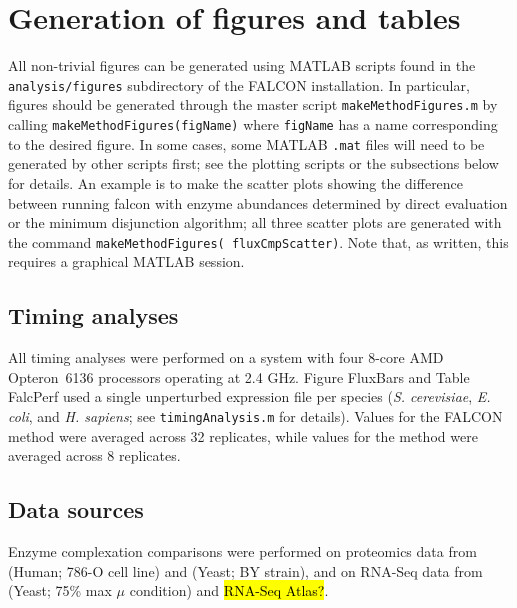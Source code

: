 \section{Generation of figures and tables}

All non-trivial figures can be generated using MATLAB scripts found in
the \texttt{analysis/figures} subdirectory of the FALCON installation.
In particular, figures should be generated through the master script
\texttt{makeMethodFigures.m} by calling
\texttt{makeMethodFigures(figName)} where \texttt{figName} has a name
corresponding to the desired figure.  In some cases, some MATLAB
\texttt{.mat} files will need to be generated by other scripts first;
see the plotting scripts or the subsections below for details. An
example is to make the scatter plots showing the difference between
running falcon with enzyme abundances determined by direct evaluation
or the minimum disjunction algorithm; all three scatter plots are
generated with the command \texttt{makeMethodFigures(\textquotesingle
fluxCmpScatter\textquotesingle)}. Note that, as written, this requires
a graphical MATLAB session.

\subsection{Timing analyses}
All timing analyses were performed on a system with four 8-core AMD
Opteron\texttrademark\ 6136 processors operating at 2.4
GHz. Figure FluxBars and Table FalcPerf used a single
unperturbed expression file per species (\textit{S. cerevisiae},
\textit{E. coli}, and \textit{H. sapiens}; see
\texttt{timingAnalysis.m} for details). Values for the FALCON method
were averaged across 32 replicates, while values for the
\citealt{Lee2012} method were averaged across 8 replicates. 

\subsection{Data sources}
Enzyme complexation comparisons were performed on proteomics data
from \citealt{Gholami2013} (Human; 786-O cell line) and 
\citealt{Picotti2013} (Yeast; BY strain), and on RNA-Seq data
from \citealt{Lee2012} (Yeast; 75\% max $\mu$ condition) and 
\hl{RNA-Seq Atlas?}.
